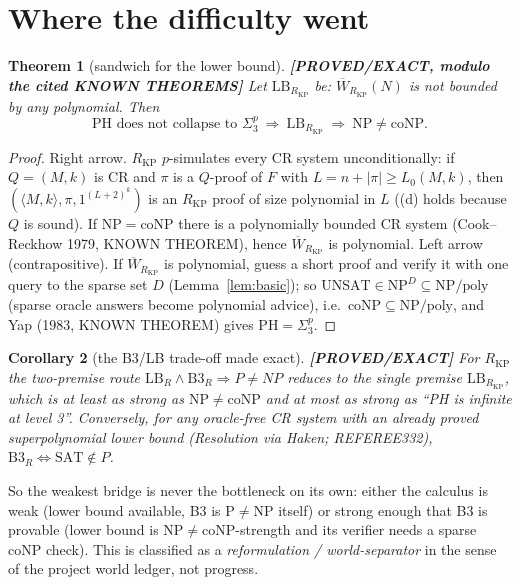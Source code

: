 \documentclass[11pt]{article}
\newtheorem{theorem}{Theorem}
\newtheorem{corollary}[theorem]{Corollary}
\theoremstyle{definition}
\theoremstyle{remark}
\newcommand{\SAT}{\mathrm{SAT}}
\newcommand{\UNSAT}{\mathrm{UNSAT}}
\newcommand{\NP}{\mathrm{NP}}
\newcommand{\coNP}{\mathrm{coNP}}
\newcommand{\Wb}{\overline W}
\newcommand{\RKP}{R_{\mathrm{KP}}}
\newcommand{\status}[1]{\textbf{[#1]}}
\begin{document}
\section{Where the difficulty went}
\begin{theorem}[sandwich for the lower bound]\label{thm:sandwich}
\status{PROVED/EXACT, modulo the cited KNOWN THEOREMS}
Let $\mathrm{LB}_{\RKP}$ be: $\Wb_{\RKP}(N)$ is not bounded by any polynomial. Then
\[
\text{PH does not collapse to }\Sigma^p_3\ \Longrightarrow\ \mathrm{LB}_{\RKP}\ \Longrightarrow\ \NP\ne\coNP .
\]
\end{theorem}
\begin{proof}
Right arrow. $\RKP$ $p$-simulates every CR system unconditionally: if $Q=(M,k)$ is CR and $\pi$ is a
$Q$-proof of $F$ with $L=n+|\pi|\ge L_0(M,k)$, then $(\langle M,k\rangle,\pi,1^{(L+2)^k})$ is an $\RKP$ proof
of size polynomial in $L$ ((d) holds because $Q$ is sound). If $\NP=\coNP$ there is a polynomially bounded CR
system (Cook--Reckhow 1979, KNOWN THEOREM), hence $\Wb_{\RKP}$ is polynomial. Left arrow (contrapositive).
If $\Wb_{\RKP}$ is polynomial, guess a short proof and verify it with one query to the sparse set $D$
(Lemma~\ref{lem:basic}); so $\UNSAT\in\NP^{D}\subseteq\NP/\mathrm{poly}$ (sparse oracle answers become
polynomial advice), i.e.\ $\coNP\subseteq\NP/\mathrm{poly}$, and Yap (1983, KNOWN THEOREM) gives
$\mathrm{PH}=\Sigma^p_3$.
\end{proof}

\begin{corollary}[the B3/LB trade-off made exact]
\status{PROVED/EXACT}
For $\RKP$ the two-premise route $\mathrm{LB}_R\wedge\mathrm{B3}_R\Rightarrow P\ne NP$ reduces to the single
premise $\mathrm{LB}_{\RKP}$, which is at least as strong as $\NP\ne\coNP$ and at most as strong as
``PH is infinite at level 3''. Conversely, for any oracle-free CR system with an already proved
superpolynomial lower bound (Resolution via Haken; REFEREE332), $\mathrm{B3}_R\iff\SAT\notin P$.
\end{corollary}
\noindent So the weakest bridge is never the bottleneck on its own: either the calculus is weak (lower bound
available, B3 is P$\ne$NP itself) or strong enough that B3 is provable (lower bound is $\NP\ne\coNP$-strength
and its verifier needs a sparse $\coNP$ check). This is classified as a \emph{reformulation / world-separator}
in the sense of the project world ledger, not progress.
\end{document}

